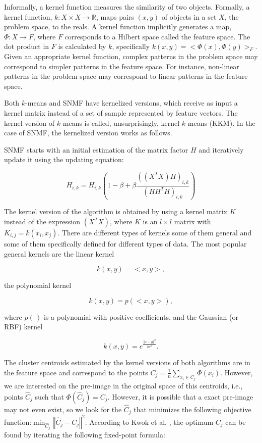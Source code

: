 \documentclass[letterpaper,12pt]{article}
\begin{document}
Informally, a kernel function measures the similarity of two objects. Formally, a kernel function, $k:X\times X\rightarrow\mathbb{R}$,
maps pairs $(x,y)$ of objects in a set $X$, the problem space, to the reals. A kernel function implicitly generates a map, $\Phi:X\rightarrow F$, where $F$ corresponds to a Hilbert space called the feature space. The dot product in $F$ is calculated by $k$, specifically $k(x,y)=<\Phi(x),\Phi(y)>_{F}$. Given an appropriate kernel function, complex patterns in the problem space may correspond to simpler patterns in the feature space. For instance, non-linear patterns in the problem space may correspond to linear patterns in the feature space. 


Both $k$-means and SNMF have kernelized versions, which receive as input a kernel matrix instead of a set of sample represented by feature vectors. The kernel version of $k$-means is called, unsurprisingly, kernel $k$-means (KKM). In the case of SNMF, the kernelized version works as follows.

SNMF starts with an initial estimation of the matrix factor $H$ and iteratively update it using the updating equation:

\[
H_{i,k}=H_{i,k}(1-\beta+\beta\frac{((X^{T}X)H)_{i,k}}{(HH^{T}H)_{i,k}})
\]


The kernel version of the algorithm is obtained by using a kernel matrix $K$ instead of the expression $(X^{T}X)$, where $K$ is an
$l\times l$ matrix with $K_{i,j}=k(x_{i},x_{j}).$ There are different types of kernels some of them general and some of them specifically defined for different types of data. The most popular general kernels are the linear kernel 

\begin{equation}
k(x,y)=<x,y>,\label{eq:id-kernel}
\end{equation}

 the polynomial kernel 
 
\[
k(x,y)=p(<x,y>),
\]

 where $p(\,)$ is a polynomial with positive coefficients, and the Gaussian (or RBF) kernel 
 
\begin{equation}
k(x,y)=e^{\frac{\left\Vert x-y\right\Vert ^{2}}{2\sigma^{2}}}.\label{eq:Gaussian-kernel}
\end{equation}


The cluster centroids estimated by the kernel versions of both algorithms are in the feature space and correspond to the points $C_{j}=\frac{1}{n}\sum_{x_{i}\in C_{j}}\Phi(x_{i})$. However, we are interested on the pre-image in the original space of this centroids, i.e., points $\hat{C}_{j}$ such that $\Phi(\hat{C}_{j})=C_{j}$. However, it is possible that a exact pre-image may not even exist, so we look for the $\hat{C}_{j}$ that minimizes the following objective function:$\min_{\hat{C}_{j}}\left\Vert \hat{C}_{j}-C_{j}\right\Vert ^{2}$. According to Kwok et al. \cite{kwok2004preimage}, the optimum $C_{j}$ can be found by iterating the following fixed-point formula:
\end{document}
